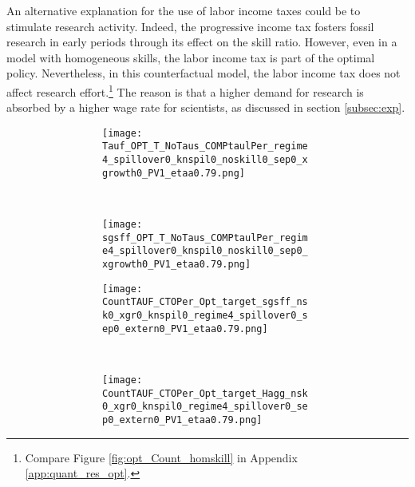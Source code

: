 An alternative explanation for the use of labor income taxes could be to stimulate research activity. 
Indeed, the progressive income tax fosters fossil research in early periods through its effect on the skill ratio. However, even in a model with homogeneous skills, the labor income tax is part of the optimal policy. Nevertheless, in this counterfactual model, the labor income tax does not affect research effort.\footnote{ Compare Figure \ref{fig:opt_Count_homskill} in Appendix \ref{app:quant_res_opt}.}  The reason is that a higher demand for research is absorbed by a higher wage rate for scientists, as discussed in section \ref{subsec:exp}. 
\begin{figure}[h!!!]
	\centering
	\caption{Decomposing effect of combined policy}\label{fig:efftaul}
	\begin{subfigure}{1\textwidth}
		\caption{\textbf{Deviation of combined policy from carbon-tax-only policy in percent}}
		\vspace{3mm}
	\begin{subfigure}{0.4\textwidth}
		\texttt{[image: Tauf\_OPT\_T\_NoTaus\_COMPtaulPer\_regime4\_spillover0\_knspil0\_noskill0\_sep0\_xgrowth0\_PV1\_etaa0.79.png]}
	\end{subfigure}
\begin{minipage}[]{0.1\textwidth}
\
\end{minipage}
\begin{subfigure}{0.4\textwidth}
	\texttt{[image: sgsff\_OPT\_T\_NoTaus\_COMPtaulPer\_regime4\_spillover0\_knspil0\_noskill0\_sep0\_xgrowth0\_PV1\_etaa0.79.png]}
\end{subfigure}
\end{subfigure}

\vspace{3mm}
	\begin{subfigure}{1\textwidth}
	\caption{\textbf{Deviation only optimal carbon tax from carbon-tax-only policy in percent}}
	\vspace{3mm}
	\begin{subfigure}{0.4\textwidth}
		\texttt{[image: CountTAUF\_CTOPer\_Opt\_target\_sgsff\_nsk0\_xgr0\_knspil0\_regime4\_spillover0\_sep0\_extern0\_PV1\_etaa0.79.png]}
	\end{subfigure}
	\begin{minipage}[]{0.1\textwidth}
		\
	\end{minipage}
	\begin{subfigure}{0.4\textwidth}
		\texttt{[image: CountTAUF\_CTOPer\_Opt\_target\_Hagg\_nsk0\_xgr0\_knspil0\_regime4\_spillover0\_sep0\_extern0\_PV1\_etaa0.79.png]}
	\end{subfigure}
\end{subfigure}


\end{figure}
